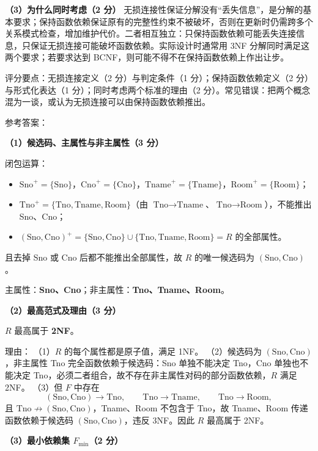 \documentclass[a4paper,11pt]{article}
\begin{document}
\textbf{（3）为什么同时考虑（2 分）}
无损连接性保证分解没有“丢失信息”，是分解的基本要求；保持函数依赖保证原有的完整性约束不被破坏，否则在更新时仍需跨多个关系模式检查，增加维护代价。二者相互独立：只保持函数依赖可能丢失连接信息，只保证无损连接可能破坏函数依赖。实际设计时通常用 3NF 分解同时满足这两个要求；若要求达到 BCNF，则可能不得不在保持函数依赖上作出让步。
\begin{analysis}评分要点：无损连接定义（2 分）与判定条件（1 分）；保持函数依赖定义（2 分）与形式化表达（1 分）；同时考虑两个标准的理由（2 分）。常见错误：把两个概念混为一谈，或认为无损连接可以由保持函数依赖推出。\end{analysis}


\q 参考答案：

\textbf{（1）候选码、主属性与非主属性（3 分）}

闭包运算：
\begin{itemize}[leftmargin=1.6em, itemsep=1pt]
  \item $\text{Sno}^{+}=\{\text{Sno}\}$，$\text{Cno}^{+}=\{\text{Cno}\}$，$\text{Tname}^{+}=\{\text{Tname}\}$，$\text{Room}^{+}=\{\text{Room}\}$；
  \item $\text{Tno}^{+}=\{\text{Tno},\text{Tname},\text{Room}\}$（由 $\text{Tno}\to\text{Tname}$、$\text{Tno}\to\text{Room}$），不能推出 Sno、Cno；
  \item $(\text{Sno},\text{Cno})^{+}=\{\text{Sno},\text{Cno}\}\cup\{\text{Tno},\text{Tname},\text{Room}\}=R$ 的全部属性。
\end{itemize}
且去掉 Sno 或 Cno 后都不能推出全部属性，故 $R$ 的唯一候选码为 $(\text{Sno},\text{Cno})$。

主属性：\textbf{Sno、Cno}；非主属性：\textbf{Tno、Tname、Room}。

\textbf{（2）最高范式及理由（3 分）}

$R$ 最高属于 \textbf{2NF}。

理由：
（1）$R$ 的每个属性都是原子值，满足 1NF。
（2）候选码为 $(\text{Sno},\text{Cno})$，非主属性 Tno 完全函数依赖于候选码：Sno 单独不能决定 Tno，Cno 单独也不能决定 Tno，必须二者组合，故不存在非主属性对码的部分函数依赖，$R$ 满足 2NF。
（3）但 $F$ 中存在
\[
(\text{Sno},\text{Cno})\to\text{Tno},\qquad \text{Tno}\to\text{Tname},\qquad \text{Tno}\to\text{Room},
\]
且 $\text{Tno}\not\to(\text{Sno},\text{Cno})$，Tname、Room 不包含于 Tno，故 Tname、Room 传递函数依赖于候选码 $(\text{Sno},\text{Cno})$，违反 3NF。因此 $R$ 最高属于 2NF。

\textbf{（3）最小依赖集 $F_{\min}$（2 分）}
\end{document}
